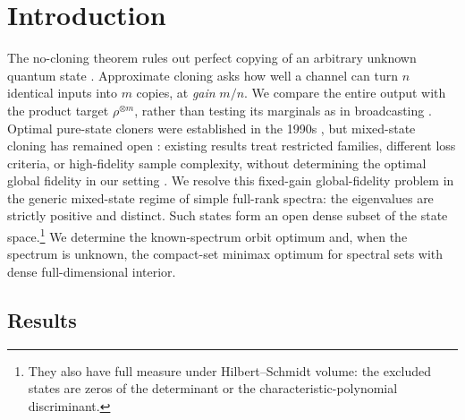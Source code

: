 \documentclass[11pt]{article}
\theoremstyle{remark}
\theoremstyle{plain}
\newcommand{\ot}{\otimes}
\begin{document}
\clearpage
\tableofcontents

\section{Introduction}\label{sec:introduction-results}

The no-cloning theorem rules out perfect copying of an arbitrary unknown
quantum state \cite{WoottersZurek1982,Dieks1982}.  Approximate cloning asks
how well a channel can turn \(n\) identical inputs into \(m\) copies, at
\emph{gain} \(m/n\).  We compare the entire output with the product
target \(\rho^{\ot m}\), rather than testing its marginals as in broadcasting
\cite{BarnumCavesFuchsJozsaSchumacher1996}.  Optimal pure-state cloners
were established in the 1990s \cite{Werner1998,KeylWerner1999}, but
mixed-state cloning has remained open
\cite{ScaraniIblisdirGisinAcin2005}: existing results treat restricted
families, different loss criteria, or high-fidelity sample complexity,
without determining the optimal global fidelity in our setting
\cite{BuscemiDArianoMacchiavelloPerinotti2005Optimal,BuscemiDArianoMacchiavelloPerinotti2006,DangFan2007,FanLiuShi2007,Kazakov2007,LiTheilHarrowChuang2026,FanizzaGrinkoScharnhorstSpilecki2026,JeonSohnOh2026}.
We resolve this fixed-gain global-fidelity problem in the generic
mixed-state regime of simple full-rank spectra: the eigenvalues are
strictly positive and distinct.  Such states form an open dense
subset of the state space.\footnote{They also have full measure under
Hilbert--Schmidt volume: the excluded states are zeros of the determinant
or the characteristic-polynomial discriminant.}  We determine the
known-spectrum orbit optimum and, when the spectrum is unknown, the
compact-set minimax optimum for spectral sets with dense full-dimensional
interior.

\subsection{Results}\label{sec:main-results}
\end{document}
